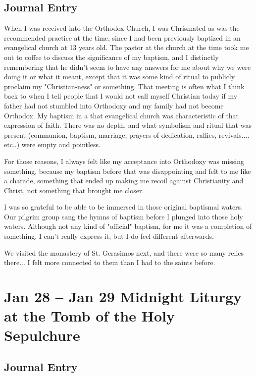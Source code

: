 \documentclass[letterpaper]{report}
\begin{document}
\section{Journal Entry}
When I was received into the Orthodox Church,
I was Chrismated as was the recommended practice at the time,
since I had been previously baptized in an evangelical church at 13 years old.
The pastor at the church at the time took me out to coffee to discuss the significance of my baptism,
and I distinctly remembering that he didn't seem to have any answers for me about why we were doing it or what it meant,
except that it was some kind of ritual to publicly proclaim my "Christian-ness" or something.
That meeting is often what I think back to when I tell people that I would not call myself Christian today if my father had not stumbled into Orthodoxy and my family had not become Orthodox.
My baptism in a that evangelical church was characteristic of that expression of faith.
There was no depth, and what symbolism and ritual that was present (communion, baptism, marriage, prayers of dedication, rallies, revivals.... etc..) were empty and pointless.

For those reasons, I always felt like my acceptance into Orthodoxy was missing something,
because my baptism before that was disappointing and felt to me like a charade,
something that ended up making me recoil against Christianity and Christ,
not something that brought me closer.

I was so grateful to be able to be immersed in those original baptismal waters.
Our pilgrim group sang the hymns of baptism before I plunged into those holy waters.
Although not any kind of "official" baptism,
for me it was a completion of something.
I can't really express it,
but I do feel different afterwards. 

We visited the monastery of St. Gerasimos next,
and there were so many relics there...
I felt more connected to them than I had to the saints before. 

\clearpage
\chapter{Jan 28 -- Jan 29 Midnight Liturgy at the Tomb of the Holy Sepulchure}
\section{Journal Entry}
\end{document}

